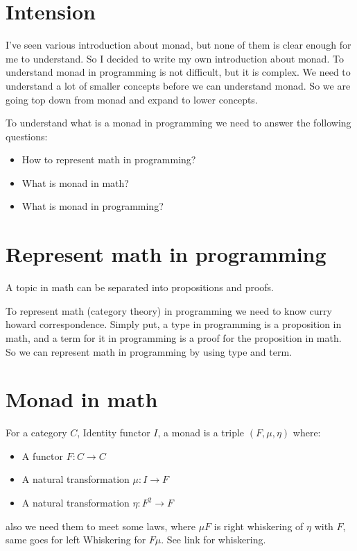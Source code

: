 \documentclass{paper}
\begin{document}
\section*{Intension}
I've seen various introduction about monad, but none of them is clear enough for me to understand. So I decided to write my own introduction about monad.
To understand monad in programming is not difficult, but it is complex. We need to understand a lot of smaller concepts before we can understand monad.
So we are going top down from monad and expand to lower concepts.

To understand what is a monad in programming we need to answer the following questions:
\begin{itemize}
  \item How to represent math in programming?
  \item What is monad in math?
  \item What is monad in programming?
\end{itemize}

\section*{Represent math in programming}
A topic in math can be separated into propositions and proofs.

To represent math (category theory) in programming we need to know curry howard correspondence.
Simply put, a type in programming is a proposition in math, and a term for it in programming
is a proof for the proposition in math. So we can represent math in programming by using type and term.

\pagebreak
\section*{Monad in math}

For a category $C$, Identity functor $I$,
a monad is a triple $(F, \mu, \eta)$ where:
\begin{itemize}
  \item A functor $F : C \to C$
  \item A natural transformation $\mu : I \to F$
  \item A natural transformation $\eta : F^2 \to F$
\end{itemize}

also we need them to meet some laws,
where $\mu F$ is right whiskering of $\eta$ with $F$, same goes for left Whiskering for $F\mu$.
See link for whiskering.
\end{document}
